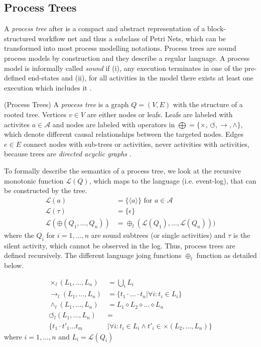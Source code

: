\documentclass[a4paper]{IEEEtran}
\begin{document}
\subsection{Process Trees}
A \textit{process tree} after \cite{leemans2015scalable} is a compact and abstract representation of a block-structured workflow net and thus a subclass of Petri Nets, which can be transformed into most process modelling notations. Process trees are sound process models by construction and they describe a regular language.
A process model is informally called \textit{sound} if (i), any execution terminates in one of the pre-defined end-states and (ii), for all activities in the model there exists at least one execution which includes it \cite{soundness}.
\begin{defn} (Process Trees) \cite{inductivemining-constructive}
A \textit{process tree} is a graph $Q = (V, E)$ with the structure of a rooted tree. Vertices $v \in V$ are either nodes or leafs. Leafs are labeled with activites $a \in \mathcal{A}$ and nodes are labeled with operators in $\bigoplus = \{ \times, \, \circlearrowleft, \rightarrow, \wedge \}$, which denote different causal relationships between the targeted nodes. Edges $e \in E$ connect nodes with sub-trees or activities, never activities with activities, because trees are \textit{directed acyclic graphs} \cite{treeIntroduction}.
\end{defn}
To formally describe the semantics of a process tree, we look at the recursive monotonic function $\mathcal{L}(Q)$, which maps to the language (i.e. event-log),  that can be constructed by the tree. 
\begin{align*}
   \mathcal{L}(a) &= \{ \langle a \rangle\} \text{ for } a \in \mathcal{A} \\
   \mathcal{L}(\tau) &= \{ \epsilon \} \\
    \mathcal{L}(\oplus(Q_1, \dots, Q_n)) &= \oplus_l(\mathcal{L}(Q_1), \dots, \mathcal{L}(Q_n)))
\end{align*}
where the $Q_i$ for $ i=1, \dots, n$ are sound subtrees (or single activities) and $\tau$ is the silent activity, which cannot be observed in the log. Thus, process trees are defined recursively.
The different language joing functions $\oplus_l$ function as detailed below.

\begin{align}
\label{eq:operators}
    \times_l(L_1, \dots, L_n) &= \bigcup_{i} L_i \\
    \rightarrow_l(L_1, \dots, L_n) &= \{ t_1 \cdot \dots \cdot t_n | \forall i : t_i \in L_i\} \\
    \wedge_l(L_1, \dots, L_n) &= L_1 \diamond L_2 \diamond \dots \diamond L_n \\
    \circlearrowleft_l(L_1, \dots, L_n) &= \\
    \{ t_1 \cdot t'_1 \dots t_m &| \forall i: t_i \in L_i \wedge t'_i \in \times(L_2,\dots, L_n)\} 
\end{align}
where $i = 1, \dots, n$ and $L_i = \mathcal{L}(Q_i)$
\end{document}
